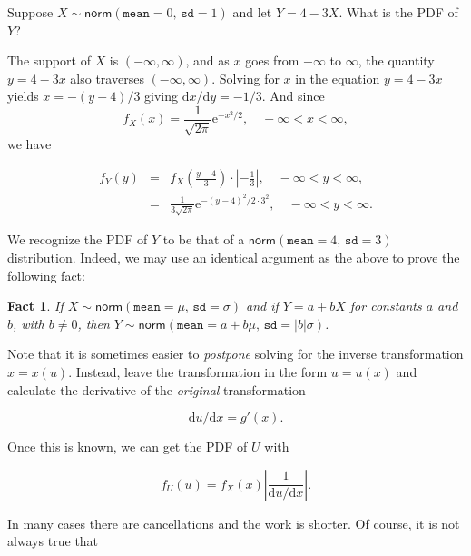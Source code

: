 \documentclass[]{book}
\numberwithin{equation}{chapter}
\numberwithin{figure}{chapter}
\theoremstyle{plain}
\newtheorem{fact}[thm]{Fact}
\theoremstyle{definition}
\theoremstyle{remark}
\theoremstyle{definition}
\theoremstyle{definition}
\theoremstyle{remark}
\let\BeginKnitrBlock\begin \let\EndKnitrBlock\end
\begin{document}
\bigskip

\BeginKnitrBlock{example}
\protect\hypertarget{ex:lin-trans-norm}{}{\label{ex:lin-trans-norm}}Suppose
\(X\sim\mathsf{norm}(\mathtt{mean}=0,\,\mathtt{sd}=1)\) and let
\(Y=4-3X\). What is the PDF of \(Y\)?
\EndKnitrBlock{example}

The support of \(X\) is \((-\infty,\infty)\), and as \(x\) goes from
\(-\infty\) to \(\infty\), the quantity \(y=4-3x\) also traverses
\((-\infty,\infty)\). Solving for \(x\) in the equation \(y=4-3x\)
yields \(x=-(y-4)/3\) giving \(\mathrm{d} x/\mathrm{d} y=-1/3\). And
since \[ f_{X}(x)=\frac{1}{\sqrt{2\pi}}\mathrm{e}^{-x^{2}/2}, \quad
-\infty < x < \infty , \] we have

\begin{eqnarray*}
f_{Y}(y) & = & f_{X}\left(\frac{y-4}{3}\right)\cdot\left|-\frac{1}{3}\right|,\quad -\infty < y < \infty,\\
 & = & \frac{1}{3\sqrt{2\pi}}\mathrm{e}^{-(y-4)^{2}/2\cdot3^{2}},\quad -\infty < y < \infty.
\end{eqnarray*}

We recognize the PDF of \(Y\) to be that of a
\(\mathsf{norm}(\mathtt{mean}=4,\,\mathtt{sd}=3)\) distribution. Indeed,
we may use an identical argument as the above to prove the following
fact:

\bigskip

\begin{fact}
If \(X\sim\mathsf{norm}(\mathtt{mean}=\mu,\,\mathtt{sd}=\sigma)\) and if
\(Y=a+bX\) for constants \(a\) and \(b\), with \(b\neq0\), then
\(Y\sim\mathsf{norm}(\mathtt{mean}=a+b\mu,\,\mathtt{sd}=|b|\sigma)\).
\end{fact}

Note that it is sometimes easier to \emph{postpone} solving for the
inverse transformation \(x=x(u)\). Instead, leave the transformation in
the form \(u=u(x)\) and calculate the derivative of the \emph{original}
transformation

\begin{equation}
\mathrm{d} u/\mathrm{d} x=g'(x).
\end{equation}

Once this is known, we can get the PDF of \(U\) with

\begin{equation}
f_{U}(u)=f_{X}(x)\left|\frac{1}{\mathrm{d} u/\mathrm{d} x}\right|.
\end{equation}

In many cases there are cancellations and the work is shorter. Of
course, it is not always true that
\end{document}
